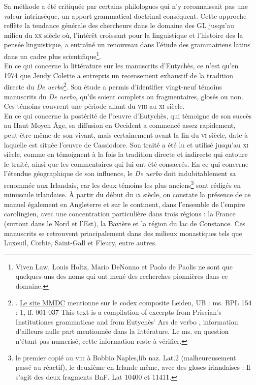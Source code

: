 \documentclass[a4paper, twoside, 12pt]{book}
\begin{document}
Sa méthode a été critiquée par certains philologues qui n'y reconnaissait pas une valeur intrinsèque, un apport grammatical doctrinal conséquent. Cette approche reflète la tendance générale des chercheurs dans le domaine des GL jusqu'au milieu du \textsc{xx}\ieme{} siècle où, l'intérêt croissant pour la linguistique et l'histoire des la pensée linguistique, a entraîné un renouveau dans l'étude des grammairiens latins dans un cadre plus scientifique\footnote{Viven Law, Louis Holtz, Mario DeNonno et Paolo de Paolis ne sont que quelques-uns des noms qui ont mené des recherches pionnières dans ce domaine.}. \\

En ce qui concerne la littérature sur les manuscrits d'Eutychès, ce n'est qu'en 1974 que Jeudy Colette a entrepris un recensement exhaustif de la tradition directe du \textit{De uerbo}\footnote{\cite{jeudy1974manuscrits}. \href{http://www.mmdc.nl/static/site/index.html}{Le site MMDC} mentionne sur le codex composite Leiden, UB : ms. BPL 154 : 1, ff. 001-037 \og{} This text is a compilation of excerpts from Priscian's Institutiones grammaticae and from Eutychès' Ars de verbo \fg{}, information d'ailleurs nulle part mentionnée dans la littérature. Le ms. en question n'étant pas numerisé, cette information reste à vérifier.}. Son étude a permis d'identifier vingt-neuf témoins manuscrits du \textit{De uerbo}, qu'ils soient complets ou fragmentaires, glosés ou non. Ces témoins couvrent une période allant du \textsc{viii}\ieme{} au \textsc{xi}\ieme{} siècle.\\

En ce qui concerne la postérité de l'œuvre d'Eutychès, qui témoigne de son succès au Haut Moyen Âge, sa diffusion en Occident a commencé assez rapidement, peut-être même de son vivant, mais certainement avant la fin du \textsc{vi}\ieme{} siècle, date à laquelle est située l'œuvre de Cassiodore. Son traité a été lu et utilisé jusqu'au \textsc{xi}\ieme{} siècle,  comme en témoignent à la fois la tradition directe et indirecte qui entoure le traité, ainsi que les commentaires qui lui ont été consacrés. En ce qui concerne l'étendue géographique de son influence, le \textit{De uerbo} doit indubitablement sa renommée aux Irlandais, car les deux témoins les plus anciens\footnote{le  premier  copié  au \textsc{viii}\ieme{} à  Bobbio  Naples,lib naz. Lat.2 (malheureusement passé au réactif),  le  deuxième  en  Irlande même,  avec  des gloses  irlandaises : Il s'agit des deux fragments BnF. Lat 10400  et 11411.} sont rédigés en minuscule irlandaise. À partir du début du \textsc{ix}\ieme{} siècle, on constate la présence de ce manuel également en Angleterre et sur le continent, dans l'ensemble de l'empire carolingien, avec une concentration particulière dans trois régions : la France (surtout dans le Nord et l'Est), la Bavière et la région du lac de Constance. Ces manuscrits se retrouvent principalement dans des milieux monastiques tels que Luxeuil, Corbie, Saint-Gall et Fleury, entre autres.\\
\end{document}
